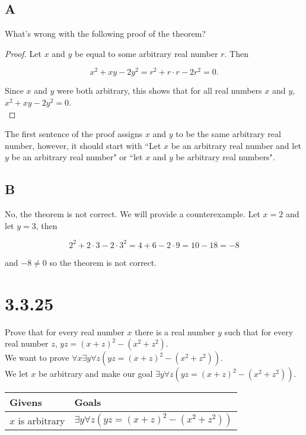 \documentclass{article}
\newcommand{\n}{ \noindent }
\begin{document}
\subsection*{A}
What's wrong with the following proof of the theorem? \\

\begin{proof}
Let $x$ and $y$ be equal to some arbitrary real number $r$. Then

\begin{equation*}
x^2 + xy - 2y^2 = r^2 + r \cdot r - 2r^2 = 0.
\end{equation*}

\n Since $x$ and $y$ were both arbitrary, this shows that for all real numbers $x$ and $y$, $x^2 + xy - 2y^2 = 0$. \\
\end{proof}

\n The first sentence of the proof assigns $x$ and $y$ to be the same arbitrary real number, however, it should start with ``Let $x$ be an arbitrary real number and let $y$ be an arbitrary real number" or ``let $x$ and $y$ be arbitrary real numbers". 

\subsection*{B}
No, the theorem is not correct. We will provide a counterexample. Let $x = 2$ and let $y = 3$, then

\begin{equation*}
2^2 + 2 \cdot 3 - 2 \cdot 3^2 = 4 + 6 - 2 \cdot 9 = 10 - 18 = -8
\end{equation*}

\n and $ -8 \neq 0$ so the theorem is not correct.

\section*{3.3.25}
Prove that for every real number $x$ there is a real number $y$ such that for every real number $z$, $yz = (x + z)^2 - (x^2 + z^2)$. \\

\n We want to prove
$\forall x \exists y \forall z (yz = (x + z)^2 - (x^2 + z^2))$.\\

\n We let $x$ be arbitrary and make our goal $\exists y \forall z (yz = (x + z)^2 - (x^2 + z^2))$. \\

\begin{table}[h]
\begin{tabular}{ll}
\hline
Givens & Goals   \\ \hline
$x$ is arbitrary & $\exists y \forall z (yz = (x + z)^2 - (x^2 + z^2))$ \\  \hline
\end{tabular}
\end{table}
\end{document}

